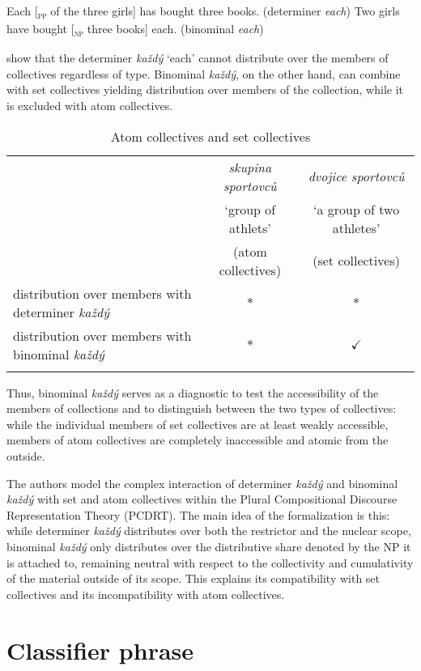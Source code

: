 \documentclass[output=paper,
colorlinks,
citecolor=brown,
newtxmath
]{langscibook}
\begin{document}
\ea \label{ex:12} \ea Each [\textsubscript{\textsc{pp}} of the three girls] has bought three books. \hfill (determiner \textit{each})\label{ex:12a}
\ex Two girls have bought [\textsubscript{\textsc{np}} three books] each. \hfill (binominal \textit{each})\label{ex:12b}
\z \z

\noindent \citeauthor{Docekal.Simik2021} show that the determiner \textit{každý} `each' cannot distribute over the members of collectives regardless of type. Binominal \textit{každý}, on the other hand, can combine with set collectives yielding distribution over members of the collection, while it is excluded with atom collectives.

\begin{table}
\centering
\begin{tabularx}{\textwidth}{Qcc}
\lsptoprule
 & \textit{skupina sportovců} & \textit{dvojice sportovců} \tabularnewline
 & `group of athlets' & `a group of two athletes' \tabularnewline
 & (atom collectives) & (set collectives) \tabularnewline
\midrule
distribution over members with determiner \textit{každý} & $*$ & $*$ \tabularnewline
\midrule
distribution over members with binominal \textit{každý}  & $*$ & $\checkmark$ \tabularnewline
\lspbottomrule
\end{tabularx}
\caption{Atom collectives and set collectives}
\label{table:3}
\end{table}

Thus, binominal \textit{každý} serves as a diagnostic to test the accessibility of the members of collections and to distinguish between the two types of collectives: while the individual members of set collectives are at least weakly accessible, members of atom collectives are completely inaccessible and atomic from the outside.

The authors model the complex interaction of determiner \textit{každý} and binominal \textit{každý} with set and atom collectives within the Plural Compositional Discourse Representation Theory (PCDRT). The main idea of the formalization is this: while determiner \textit{každý} distributes over both the restrictor and the nuclear scope, binominal \textit{každý} only distributes over the distributive share denoted by the NP it is attached to, remaining neutral with respect to the collectivity and cumulativity of the material outside of its scope. This explains its compatibility with set collectives and its incompatibility with atom collectives.

\section{Classifier phrase}
\end{document}
